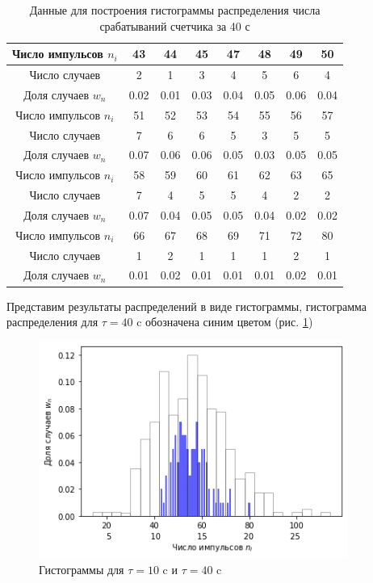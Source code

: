 \documentclass[a4paper,12pt]{article} %
\begin{document}
\begin{table}
\caption{Данные для построения гистограммы распределения числа срабатываний счетчика за 40 с} \label{40c}
\begin{tabular}{|c|c|c|c|c|c|c|c|}
\hline 
Число импульсов $n_i$ & 43 & 44 & 45 & 47 & 48 & 49 & 50\\ 
\hline 
Число случаев & 2 & 1 & 3 & 4 & 5 & 6 & 4 \\ 
\hline 
Доля случаев $w_n$ & 0.02 & 0.01 & 0.03 & 0.04 & 0.05 & 0.06 & 0.04 \\ 
\hline 
\hline 
Число импульсов $n_i$ & 51 & 52 & 53 & 54 & 55 & 56 & 57\\ 
\hline 
Число случаев & 7 & 6 & 6 & 5 & 3 & 5 & 5 \\ 
\hline 
Доля случаев $w_n$ & 0.07 & 0.06 & 0.06 & 0.05 & 0.03 & 0.05 & 0.05 \\ 
\hline 
\hline 
Число импульсов $n_i$ & 58 & 59 & 60 & 61 & 62 & 63 & 65\\ 
\hline 
Число случаев & 7 & 4 & 5 & 5 & 4 & 2 & 2 \\ 
\hline 
Доля случаев $w_n$ & 0.07 & 0.04 & 0.05 & 0.05 & 0.04 & 0.02 & 0.02 \\ 
\hline 
\hline
Число импульсов $n_i$ & 66 & 67 & 68 & 69 & 71 & 72 & 80\\ 
\hline 
Число случаев & 1 & 2 & 1 & 1 & 1 & 2 & 1 \\ 
\hline 
Доля случаев $w_n$ & 0.01 & 0.02 & 0.01 & 0.01 & 0.01& 0.02 & 0.01 \\ 
 
\hline 

\end{tabular} 
\end{table}
Представим результаты распределений в виде гистограммы, гистограмма распределения для $\tau=\text{40 c}$ обозначена синим цветом (рис. \ref{gist})

\begin{figure}[h!]
\begin{center}
\includegraphics[width=0.9\textwidth]{gist}
\caption{Гистограммы для $\tau=\text{10 c}$ и $\tau=\text{40 c}$} \label{gist}
\end{center}

\end{figure}
\end{document}
